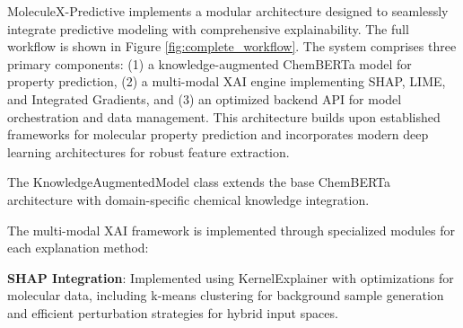 \documentclass[preprint,12pt]{elsarticle}
\begin{document}
MoleculeX-Predictive implements a modular architecture designed to seamlessly integrate predictive modeling with comprehensive explainability. The full workflow is shown in Figure \ref{fig:complete_workflow}. The system comprises three primary components: (1) a knowledge-augmented ChemBERTa model for property prediction, (2) a multi-modal XAI engine implementing SHAP, LIME, and Integrated Gradients, and (3) an optimized backend API for model orchestration and data management. This architecture builds upon established frameworks for molecular property prediction \cite{liu2020chemprop,ramsundar2019deep} and incorporates modern deep learning architectures \cite{he2016deep,simonyan2014very,szegedy2015going} for robust feature extraction.


The KnowledgeAugmentedModel class extends the base ChemBERTa architecture with domain-specific chemical knowledge integration.

        


The multi-modal XAI framework is implemented through specialized modules for each explanation method:

\textbf{SHAP Integration}: Implemented using KernelExplainer with optimizations for molecular data, including k-means clustering for background sample generation and efficient perturbation strategies for hybrid input spaces.
\end{document}

